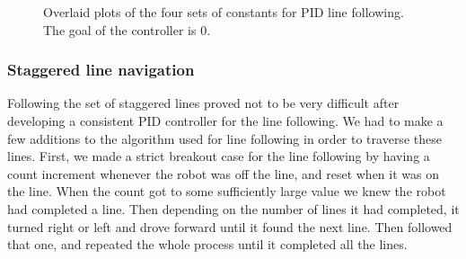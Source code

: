 \documentclass[12pt]{article}
\begin{document}
\begin{figure}
	\hfill
	
	\caption{Overlaid plots of the four sets of constants for PID line following. The goal of the controller is 0.}
	\label{pid_lines}
\end{figure}

\subsubsection{Staggered line navigation}

Following the set of staggered lines proved not to be very difficult after developing a consistent PID controller for the line following. We had to make a few additions to the algorithm used for line following in order to traverse these lines. First, we made a strict breakout case for the line following by having a count increment whenever the robot was off the line, and reset when it was on the line. When the count got to some sufficiently large value we knew the robot had completed a line. Then depending on the number of lines it had completed, it turned right or left and drove forward until it found the next line. Then followed that one, and repeated the whole process until it completed all the lines.
\end{document}
